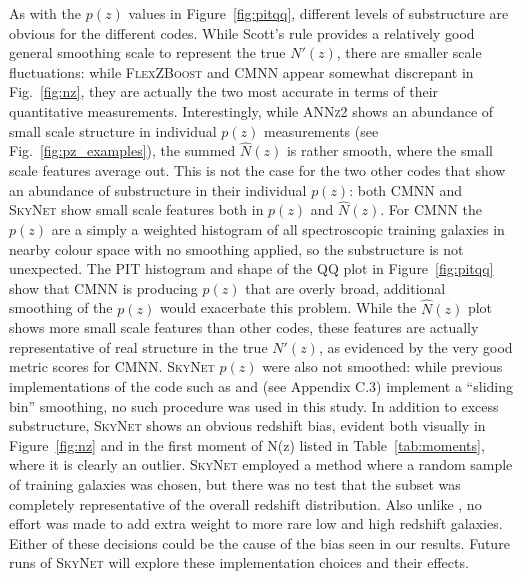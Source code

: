 \documentclass[usenatbib]{mn2e}
\begin{document}
As with the $p(z)$ values in Figure~\ref{fig:pitqq}, different levels of substructure are obvious for the different codes.  
While Scott's rule provides a relatively good general smoothing scale to represent the true $N'(z)$, there are smaller scale fluctuations: while \textsc{FlexZBoost} and \textsc{CMNN} appear somewhat discrepant in Fig.~\ref{fig:nz}, they are actually the two most accurate in terms of their quantitative measurements.   
Interestingly, while \textsc{ANNz2} shows an abundance of small scale structure in individual $p(z)$ measurements (see Fig.~\ref{fig:pz_examples}), the summed $\hat{N}(z)$ is rather smooth, where the small scale features average out.  This is not the case for the two other codes that show an abundance of substructure in their individual $p(z)$: both \textsc{CMNN} and \textsc{SkyNet} show small scale features both in $p(z)$ and $\hat{N}(z)$.  For \textsc{CMNN} the $p(z)$ are a simply a weighted histogram of all spectroscopic training galaxies in nearby colour space with no smoothing applied, so the substructure is not unexpected.  The PIT histogram and shape of the QQ plot in Figure~\ref{fig:pitqq} show that \textsc{CMNN} is producing $p(z)$ that are overly broad, additional smoothing of the $p(z)$ would exacerbate this problem.  While the $\hat{N}(z)$ plot shows more small scale features than other codes, these features are actually representative of real structure in the true $N'(z)$, as evidenced by the very good metric scores for \textsc{CMNN}.  \textsc{SkyNet} $p(z)$ were also not smoothed: while previous implementations of the code such as \citet{Sanchez:14} and \citet{Bonnett:15} (see Appendix C.3) implement a ``sliding bin'' smoothing, no such procedure was used in this study.  In addition to excess substructure, \textsc{SkyNet} shows an obvious redshift bias, evident both visually in Figure~\ref{fig:nz} and in the first moment of N(z) listed in Table~\ref{tab:moments}, where it is clearly an outlier.  \textsc{SkyNet} employed a method where a random sample of training galaxies was chosen, but there was no test that the subset was completely representative of the overall redshift distribution.  Also unlike \citet{Bonnett:15}, no effort was made to add extra weight to more rare low and high redshift galaxies.  Either of these decisions could be the cause of the bias seen in our results.  Future runs of \textsc{SkyNet} will explore these implementation choices and their effects.
\end{document}

